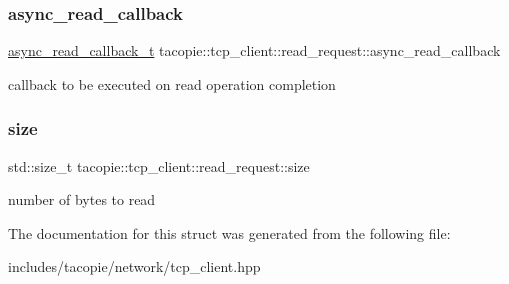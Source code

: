 \subsubsection{\texorpdfstring{async\+\_\+read\+\_\+callback}{async\_read\_callback}}
{\footnotesize\ttfamily \hyperlink{classtacopie_1_1tcp__client_acdf9dea8bac6c56f7b04ce38b9432322}{async\+\_\+read\+\_\+callback\+\_\+t} tacopie\+::tcp\+\_\+client\+::read\+\_\+request\+::async\+\_\+read\+\_\+callback}

callback to be executed on read operation completion \mbox{\label{structtacopie_1_1tcp__client_1_1read__request_ad8b69f61884c60596aface363ca947a3}} 
\subsubsection{\texorpdfstring{size}{size}}
{\footnotesize\ttfamily std\+::size\+\_\+t tacopie\+::tcp\+\_\+client\+::read\+\_\+request\+::size}

number of bytes to read 

The documentation for this struct was generated from the following file\+:\begin{DoxyCompactItemize}
\item 
includes/tacopie/network/tcp\+\_\+client.\+hpp\end{DoxyCompactItemize}
